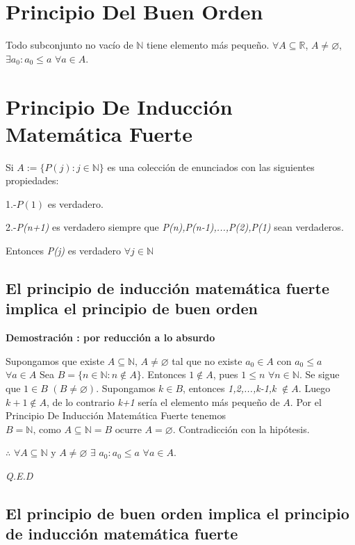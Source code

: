 \documentclass{book}
\begin{document}
\section{Principio Del Buen Orden}

Todo subconjunto no vacío de $\mathbb{N}$ tiene elemento más pequeño.
$\forall A\subseteq{\mathbb{R}}$, $ A\neq \varnothing$, $\exists a_0 :a_0 \le a$ $ \forall a\in{A}$.
\section{Principio De Inducción Matemática Fuerte}
Si $A:=\lbrace P(j):j\in{\mathbb{N}}\rbrace$ es una colección de enunciados con las siguientes propiedades:

1.-$P(1)$ es verdadero.

2.-\textit{P(n+1)} es verdadero siempre que \textit{P(n),P(n-1),...,P(2),P(1)} sean verdaderos.

Entonces \textit{P(j)} es verdadero $\forall j\in{\mathbb{N}}$

\subsection{El principio de inducción matemática fuerte implica el principio de buen orden}

\textbf{Demostración : por reducción a lo absurdo}


Supongamos que existe $A\subseteq \mathbb{N}$, $A\neq \varnothing$ tal que no existe $a_0
\in A\mbox{ con }a_0\le{a}$ $\forall a\in{A}$
Sea $B=\lbrace n\in{\mathbb{N}}:n\notin{A} \rbrace$. Entonces $1\notin{A}$, pues $ 1\le{n}$ $\forall{n\in{\mathbb{N}}}$.
Se sigue que $1\in{B}$ $(B\neq \varnothing)$.
Supongamos $k\in{B}$, entonces \textit{1,2,...,k-1,k} $\notin{A}$.
Luego $k+1\notin{A}$, de lo contrario \textit{k+1} sería el elemento más pequeño de $A$.
Por el Principio De Inducción Matemática Fuerte tenemos $B=\mathbb{N}\mbox{, como }A\subseteq{\mathbb{N}}=B\mbox{ ocurre }A=\varnothing$.
Contradicción con la hipótesis.

$\therefore$ $\forall A\subseteq{\mathbb{N}}$ y $A\neq{\varnothing}$ $\exists$ $a_0:a_0\le{a}$ $\forall{a\in{A}}$.

\textit{Q.E.D}

\subsection{El principio de buen orden implica el principio de inducción matemática fuerte}
\end{document}
